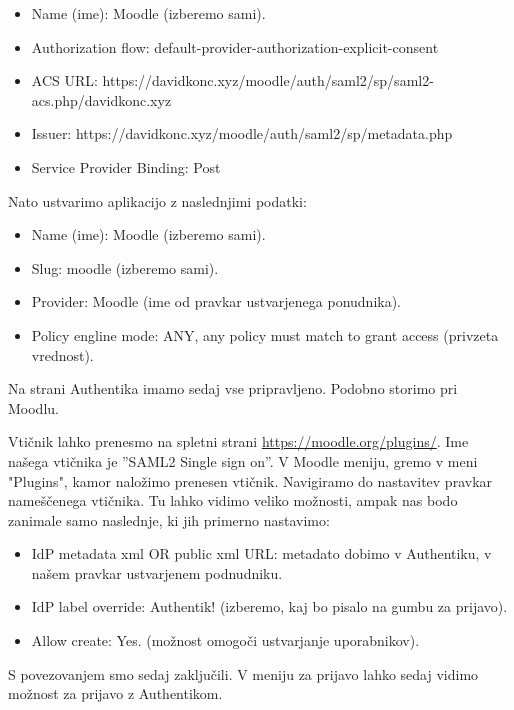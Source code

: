 \documentclass[a4paper,12pt,openright]{book}
\begin{document}
\begin{itemize}
    \item Name (ime): Moodle (izberemo sami).
    \item Authorization flow: default-provider-authorization-explicit-consent
    \item ACS URL: https://davidkonc.xyz/moodle/auth/saml2/sp/saml2-acs.php/davidkonc.xyz
    \item Issuer: https://davidkonc.xyz/moodle/auth/saml2/sp/metadata.php
    \item Service Provider Binding:  Post
\end{itemize}

Nato ustvarimo aplikacijo z naslednjimi podatki:
\begin{itemize}
    \item Name (ime): Moodle (izberemo sami).
    \item Slug: moodle (izberemo sami).
    \item Provider: Moodle (ime od pravkar ustvarjenega ponudnika).
    \item Policy engline mode: ANY, any policy must match to grant access (privzeta vrednost). 
\end{itemize}

Na strani Authentika imamo sedaj vse pripravljeno. Podobno storimo pri Moodlu. 

Vtičnik lahko prenesmo na spletni strani \href{https://moodle.org/plugins/}{https://moodle.org/plugins/}. Ime našega vtičnika je ''SAML2 Single sign on''. V Moodle meniju, gremo v meni "Plugins", kamor naložimo prenesen vtičnik. 
Navigiramo do nastavitev pravkar nameščenega vtičnika. Tu lahko vidimo veliko možnosti, ampak nas bodo zanimale samo naslednje, ki jih primerno nastavimo:
\begin{itemize}
    \item IdP metadata xml OR public xml URL: metadato dobimo v Authentiku, v našem pravkar ustvarjenem podnudniku.
    \item IdP label override: Authentik! (izberemo, kaj bo pisalo na gumbu za prijavo).
    \item Allow create: Yes. (možnost omogoči ustvarjanje uporabnikov).
\end{itemize}
S povezovanjem smo sedaj zaključili. V meniju za prijavo lahko sedaj vidimo možnost za prijavo z Authentikom.
\end{document}
